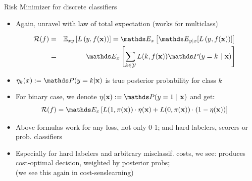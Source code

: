 \documentclass[11pt,compress,t,notes=noshow, xcolor=table]{beamer}
\begin{document}
\begin{vbframe}{Risk Minimizer for discrete classifiers}

\begin{itemize}

\item Again, unravel with law of total expectation (works for multiclass)

\vspace*{-0.5cm}

\begin{eqnarray*}
  \riskf  & = & \Exy\left[\Lxy\right] = \E_x \left[ \E_{y|x} [ \Lxy ] \right] \\
          & = & \E_x \left[\sum_{k \in \Yspace} L(k, \fx) \P(y = k~|~ \xv)\right] 
\end{eqnarray*}

\item $\eta_k(x) := \P(y = k| \xv)$ is true posterior probability for class $k$

\item For binary case, we denote $\eta(\xv) := \P(y = 1 ~|~ \xv)$ and get: 
$$
\riskf = \E_x \left[L(1, \pix) \cdot \eta(\xv) + L(0, \pix) \cdot (1 - \eta(\xv)) \right]
$$

\item Above formulas work for any loss, not only 0-1; and hard labelers, scorers or prob. classifiers

\item Especially for hard labelers and arbitrary misclassif. costs, we see: produces cost-optimal decision, weighted by posterior probs; \\
(we see this again in cost-senslearning)





\end{itemize}

\end{vbframe}
\end{document}
